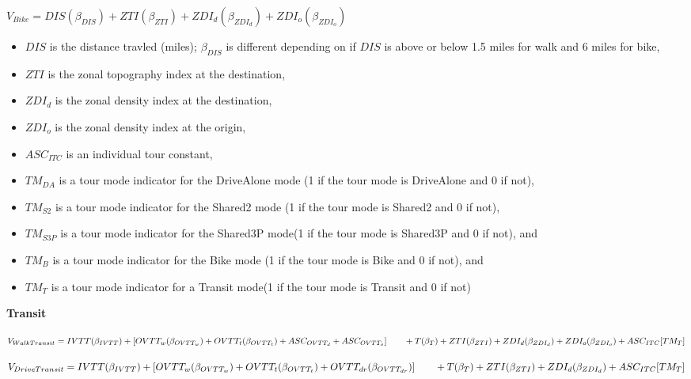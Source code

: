 \documentclass[3p, authoryear, review]{elsarticle} %
\providecommand{\tightlist}{%
  \setlength{\itemsep}{0pt}\setlength{\parskip}{0pt}}
\begin{document}
\(V_{Bike} = DIS(\beta_{DIS}) + ZTI(\beta_{ZTI}) + ZDI_d(\beta_{ZDI_d}) + ZDI_o(\beta_{ZDI_o})\)

\begin{itemize}
\tightlist
\item
  \(DIS\) is the distance travled (miles); \(\beta_{DIS}\) is different depending on if \(DIS\) is above or below 1.5 miles for walk and 6 miles for bike,
\item
  \(ZTI\) is the zonal topography index at the destination,
\item
  \(ZDI_d\) is the zonal density index at the destination,
\item
  \(ZDI_o\) is the zonal density index at the origin,
\item
  \(ASC_{ITC}\) is an individual tour constant,
\item
  \(TM_{DA}\) is a tour mode indicator for the DriveAlone mode (1 if the tour mode is DriveAlone and 0 if not),
\item
  \(TM_{S2}\) is a tour mode indicator for the Shared2 mode (1 if the tour mode is Shared2 and 0 if not),
\item
  \(TM_{S3P}\) is a tour mode indicator for the Shared3P mode(1 if the tour mode is Shared3P and 0 if not), and
\item
  \(TM_{B}\) is a tour mode indicator for the Bike mode (1 if the tour mode is Bike and 0 if not), and
\item
  \(TM_{T}\) is a tour mode indicator for a Transit mode(1 if the tour mode is Transit and 0 if not)
\end{itemize}

\textbf{Transit}

\(V_{WalkTransit} = IVTT(\beta_{IVTT}) + [OVTT_w(\beta_{OVTT_w}) + OVTT_t(\beta_{OVTT_t}) + ASC_{OVTT_d} + ASC_{OVTT_o}] \\ \qquad + T(\beta_T) + ZTI(\beta_{ZTI}) + ZDI_d(\beta_{ZDI_d}) + ZDI_o(\beta_{ZDI_o}) + ASC_{ITC}[TM_T]\)

\(V_{DriveTransit} = IVTT(\beta_{IVTT}) + [OVTT_w(\beta_{OVTT_w}) + OVTT_t(\beta_{OVTT_t}) + OVTT_{dr}(\beta_{OVTT_{dr}})] \\ \qquad + T(\beta_T) + ZTI(\beta_{ZTI}) + ZDI_d(\beta_{ZDI_d}) + ASC_{ITC}[TM_T]\)
\end{document}
